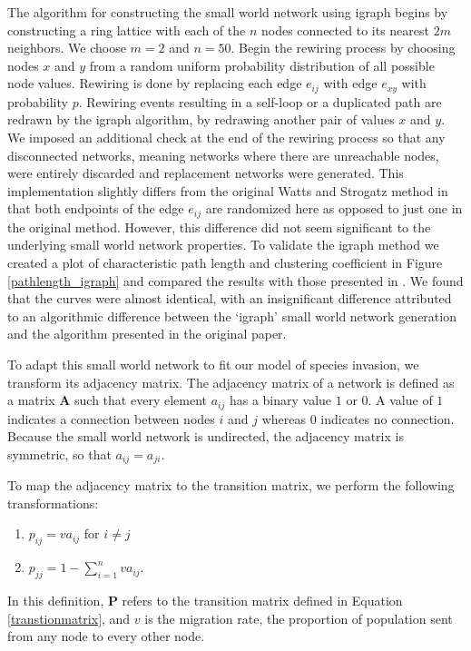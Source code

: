 \documentclass[12pt, openany]{book}
\theoremstyle{definition}
\theoremstyle{remark}
\numberwithin{equation}{chapter}
\numberwithin{figure}{chapter}
\begin{document}
The algorithm for constructing the small world network using igraph begins by constructing a ring lattice with each of the $n$ nodes connected to its nearest $2m$ neighbors. We choose $m = 2$ and $n = 50$. Begin the rewiring process by choosing nodes $x$ and $y$ from a random uniform probability distribution of all possible node values. Rewiring is done by replacing each edge $e_{ij}$ with edge $e_{xy}$ with probability $p$. Rewiring events resulting in a self-loop or a duplicated path are redrawn by the igraph algorithm, by redrawing another pair of values $x$ and $y$. We imposed an additional check at the end of the rewiring process so that any disconnected networks, meaning networks where there are unreachable nodes, were entirely discarded and replacement networks were generated. This implementation slightly differs from the original Watts and Strogatz method in that both endpoints of the edge $e_{ij}$ are randomized here as opposed to just one in the original method. However, this difference did not seem significant to the underlying small world network properties. To validate the igraph method we created a plot of characteristic path length and clustering coefficient in Figure \ref{pathlength_igraph} and compared the results with those presented in \cite{watts1998collective}. We found that the curves were almost identical, with an insignificant difference attributed to an algorithmic difference between the `igraph' small world network generation and the algorithm presented in the original paper.

To adapt this small world network to fit our model of species invasion, we transform its adjacency matrix. The adjacency matrix of a network is defined as a matrix $\textbf{A}$ such that every element $a_{ij}$ has a binary value $1$ or $0$. A value of $1$ indicates a connection between nodes $i$ and $j$ whereas $0$ indicates no connection. Because the small world network is undirected, the adjacency matrix is symmetric, so that $a_{ij} = a_{ji}$. 

To map the adjacency matrix to the transition matrix, we perform the following transformations:
\begin{center}
\begin{enumerate}
\item $p_{ij} = va_{ij}$ for $i \neq j$\\
\item $p_{jj} = 1 - \sum_{i = 1}^{n}va_{ij}$.
\end{enumerate}
\end{center}
In this definition, $\textbf{P}$ refers to the transition matrix defined in Equation \ref{transtionmatrix}, and $v$ is the migration rate, the proportion of population sent from any node to every other node.
\end{document}

